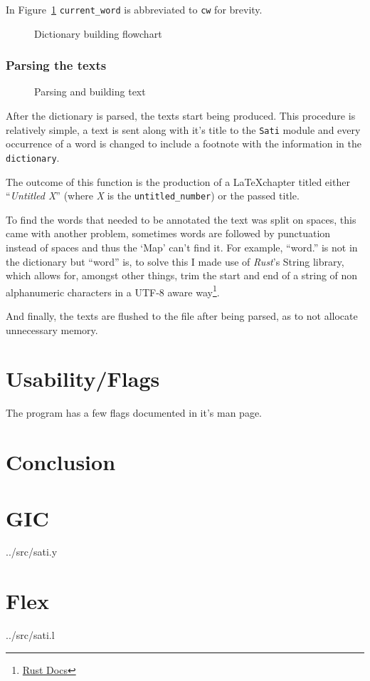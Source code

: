 \documentclass[a4paper]{report}
\begin{document}
In Figure~\ref{fig:flow} \texttt{current\_word} is abbreviated to \texttt{cw}
for brevity.

\begin{figure}[H]
    \centering
    
    \caption{Dictionary building flowchart}\label{fig:flow}
\end{figure}

\subsection{Parsing the texts}

\begin{figure}
    \centering
    
    \caption{Parsing and building text}
\end{figure}

After the dictionary is parsed, the texts start being produced. This procedure
is relatively simple, a text is sent along with it's title to the \texttt{Sati}
module and every occurrence of a word is changed to include a footnote with
the information in the \texttt{dictionary}.

The outcome of this function is the production of a \LaTeX chapter titled
either ``\textit{Untitled X}'' (where \textit{X} is the
\texttt{untitled\_number}) or the passed title.

To find the words that needed to be annotated the text was split on spaces,
this came with another problem, sometimes words are followed by punctuation
instead of spaces and thus the `Map' can't find it. For example, ``word.'' is
not in the dictionary but ``word'' is, to solve this I made use of
\textit{Rust}'s String library, which allows for, amongst other things, trim
the start and end of a string of non alphanumeric characters in a UTF-8 aware
way\footnote{\href{https://doc.rust-lang.org/std/primitive.str.html\#method.trim_start_matches}{Rust Docs}}.

And finally, the texts are flushed to the file after being parsed, as to not
allocate unnecessary memory.

\chapter{Usability/Flags}\label{cha:flags}

The program has a few flags documented in it's man page.

\chapter{Conclusion}

\appendix

\chapter{GIC}


{../src/sati.y}

\chapter{Flex}


{../src/sati.l}
\end{document}
